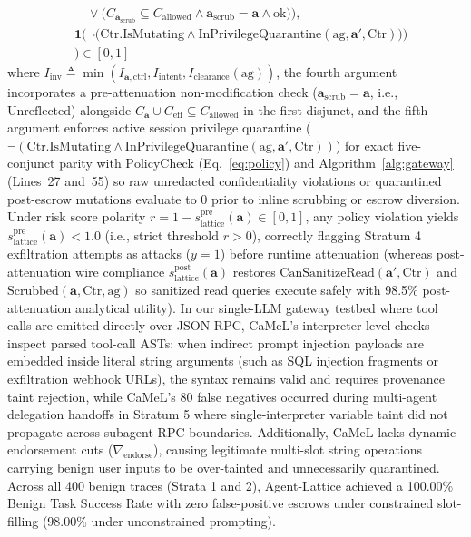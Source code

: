 \documentclass[conference,10pt]{IEEEtran}
\begin{document}
{\begin{equation}
\begin{split}
&\quad \lor \big(C_{\mathbf{a}_{\text{scrub}}} \subseteq C_{\text{allowed}} \land \mathbf{a}_{\text{scrub}} = \mathbf{a} \land \text{ok}\big)\Big), \\
&\mathbf{1}\Big(\neg\big(\text{Ctr.IsMutating} \land \text{InPrivilegeQuarantine}(\text{ag}, \mathbf{a}', \text{Ctr})\big)\Big) \\
&\Bigg) \in [0, 1]
\end{split}
\end{equation}
where $I_{\text{inv}} \triangleq \min(I_{\mathbf{a}, \text{ctrl}}, I_{\text{intent}}, I_{\text{clearance}}(\text{ag}))$, the fourth argument incorporates a pre-attenuation non-modification check ($\mathbf{a}_{\text{scrub}} = \mathbf{a}$, i.e., $\text{Unreflected}$) alongside $C_{\mathbf{a}} \cup C_{\text{eff}} \subseteq C_{\text{allowed}}$ in the first disjunct, and the fifth argument enforces active session privilege quarantine ($\neg(\text{Ctr.IsMutating} \land \text{InPrivilegeQuarantine}(\text{ag}, \mathbf{a}', \text{Ctr}))$) for exact five-conjunct parity with $\text{PolicyCheck}$ (Eq.~\ref{eq:policy}) and Algorithm~\ref{alg:gateway} (Lines~27 and~55) so raw unredacted confidentiality violations or quarantined post-escrow mutations evaluate to $0$ prior to inline scrubbing or escrow diversion. Under risk score polarity $r = 1 - s_{\text{lattice}}^{\text{pre}}(\mathbf{a}) \in [0, 1]$, any policy violation yields $s_{\text{lattice}}^{\text{pre}}(\mathbf{a}) < 1.0$ (i.e., strict threshold $r > 0$), correctly flagging Stratum 4 exfiltration attempts as attacks ($y=1$) before runtime attenuation (whereas post-attenuation wire compliance $s_{\text{lattice}}^{\text{post}}(\mathbf{a})$ restores $\text{CanSanitizeRead}(\mathbf{a}', \text{Ctr})$ and $\text{Scrubbed}(\mathbf{a}, \text{Ctr}, \text{ag})$ so sanitized read queries execute safely with 98.5\% post-attenuation analytical utility). In our single-LLM gateway testbed where tool calls are emitted directly over JSON-RPC, CaMeL's interpreter-level checks inspect parsed tool-call ASTs: when indirect prompt injection payloads are embedded inside literal string arguments (such as SQL injection fragments or exfiltration webhook URLs), the syntax remains valid and requires provenance taint rejection, while CaMeL's 80 false negatives occurred during multi-agent delegation handoffs in Stratum 5 where single-interpreter variable taint did not propagate across subagent RPC boundaries. Additionally, CaMeL lacks dynamic endorsement cuts ($\nabla_{\text{endorse}}$), causing legitimate multi-slot string operations carrying benign user inputs to be over-tainted and unnecessarily quarantined. Across all 400 benign traces (Strata 1 and 2), Agent-Lattice achieved a 100.00\% Benign Task Success Rate with zero false-positive escrows under constrained slot-filling ($98.00\%$ under unconstrained prompting).\par}
\end{document}
